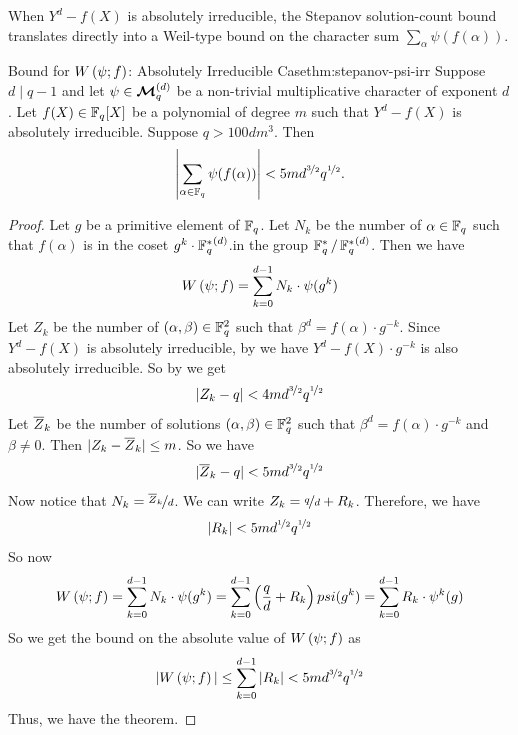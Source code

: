When $Y^d - f(X)$ is absolutely irreducible, the Stepanov solution-count bound translates directly into a Weil-type bound on the character sum $\sum_\alpha \psi(f(\alpha))$.
\begin{Theorem}{Bound for $W\left(\psi;f\right)$: Absolutely Irreducible Case}{thm:stepanov-psi-irr}
  Suppose $d\mid q-1$ and let $\psi\in\boldsymbol{\mathcal{M}}_q^{(d)}$ be a non-trivial multiplicative character of exponent $d$. Let $f(X)\in\mathbb{F}_q[X]$ be a polynomial of degree $m$ such that $Y^d-f(X)$ is absolutely irreducible. Suppose $q>100dm^3$. Then $$\left|\sum_{\alpha\in\mathbb{F}_q}\psi(f(\alpha))\right|<5md^{\nicefrac{3}{2}}q^{\nicefrac12}.$$
\end{Theorem}
\begin{proof}
  Let $g$ be a primitive element of $\mathbb{F}_q$. Let $N_{k}$ be the number of $\alpha\in\mathbb{F}_q$ such that $f(\alpha)$ is in the coset $g^k\cdot {\mathbb{F}_q^*}^{(d)}$.in the group $\quotient{\bbF_q^*}{{\bbF_q^*}^{(d)}}$. Then we have $$W\left(\psi;f\right)= \sum_{k=0}^{d-1}N_k\cdot \psi(g^k)$$Let $Z_k$ be the number of $(\alpha,\beta)\in\mathbb{F}_q^2$ such that $\beta^d=f(\alpha)\cdot g^{-k}$. Since $Y^d-f(X)$ is absolutely irreducible, by \YdFxIrrthm we have $Y^d-f(X)\cdot g^{-k}$ is also absolutely irreducible. So by \Stepanov we get $$|Z_k-q|<4md^{\nicefrac32}q^{\nicefrac12}$$Let $\overline{Z}_k$ be the number of solutions $(\alpha,\beta)\in\mathbb{F}_q^2$ such that $\beta^d=f(\alpha)\cdot g^{-k}$ and $\beta\neq 0$. Then $|Z_k-\overline{Z}_k|\leq m$. So we have $$|\overline{Z}_k-q|<5md^{\nicefrac32}q^{\nicefrac12}$$Now notice that $N_k=\nicefrac{\overline{Z}_k}{d}$. We can write $Z_k=\nicefrac{q}d+R_k$. Therefore, we have $$|R_k|< 5md^{\nicefrac12}q^{\nicefrac12}$$So now $$W\left(\psi;f\right)=\sum_{k=0}^{d-1}N_k\cdot \psi(g^k)=\sum_{k=0}^{d-1}\left(\frac{q}d+R_k\right)psi(g^k)=\sum_{k=0}^{d-1}R_k\cdot \psi^k(g)$$So we get the bound on the absolute value of $W\left(\psi;f\right)$ as $$|W\left(\psi;f\right)|\leq \sum_{k=0}^{d-1}|R_k|< 5md^{\nicefrac{3}{2}}q^{\nicefrac12}$$Thus, we have the theorem.
\end{proof}

